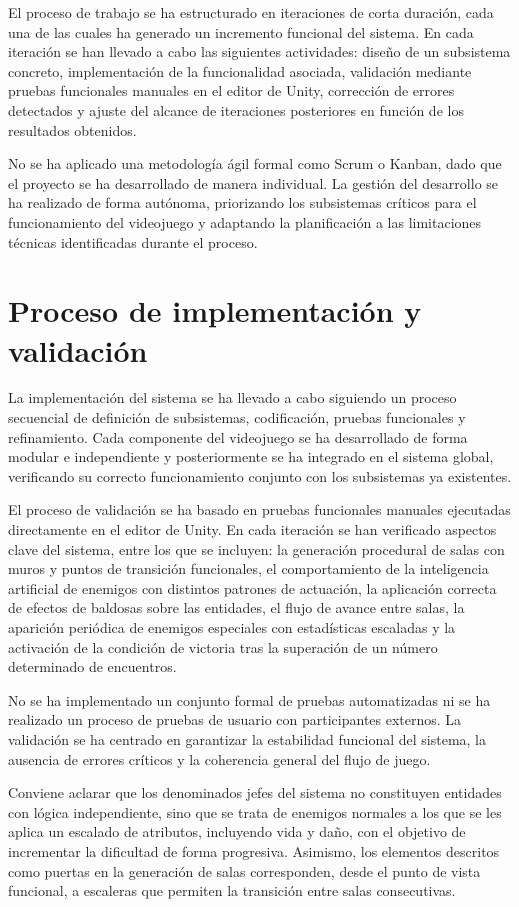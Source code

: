 El proceso de trabajo se ha estructurado en iteraciones de corta duración, cada una de las cuales ha generado un incremento funcional del sistema. En cada iteración se han llevado a cabo las siguientes actividades: diseño de un subsistema concreto, implementación de la funcionalidad asociada, validación mediante pruebas funcionales manuales en el editor de Unity, corrección de errores detectados y ajuste del alcance de iteraciones posteriores en función de los resultados obtenidos.

No se ha aplicado una metodología ágil formal como Scrum o Kanban, dado que el proyecto se ha desarrollado de manera individual. La gestión del desarrollo se ha realizado de forma autónoma, priorizando los subsistemas críticos para el funcionamiento del videojuego y adaptando la planificación a las limitaciones técnicas identificadas durante el proceso.

\section{Proceso de implementación y validación}

La implementación del sistema se ha llevado a cabo siguiendo un proceso secuencial de definición de subsistemas, codificación, pruebas funcionales y refinamiento. Cada componente del videojuego se ha desarrollado de forma modular e independiente y posteriormente se ha integrado en el sistema global, verificando su correcto funcionamiento conjunto con los subsistemas ya existentes.

El proceso de validación se ha basado en pruebas funcionales manuales ejecutadas directamente en el editor de Unity. En cada iteración se han verificado aspectos clave del sistema, entre los que se incluyen: la generación procedural de salas con muros y puntos de transición funcionales, el comportamiento de la inteligencia artificial de enemigos con distintos patrones de actuación, la aplicación correcta de efectos de baldosas sobre las entidades, el flujo de avance entre salas, la aparición periódica de enemigos especiales con estadísticas escaladas y la activación de la condición de victoria tras la superación de un número determinado de encuentros.

No se ha implementado un conjunto formal de pruebas automatizadas ni se ha realizado un proceso de pruebas de usuario con participantes externos. La validación se ha centrado en garantizar la estabilidad funcional del sistema, la ausencia de errores críticos y la coherencia general del flujo de juego.

Conviene aclarar que los denominados jefes del sistema no constituyen entidades con lógica independiente, sino que se trata de enemigos normales a los que se les aplica un escalado de atributos, incluyendo vida y daño, con el objetivo de incrementar la dificultad de forma progresiva. Asimismo, los elementos descritos como puertas en la generación de salas corresponden, desde el punto de vista funcional, a escaleras que permiten la transición entre salas consecutivas.
